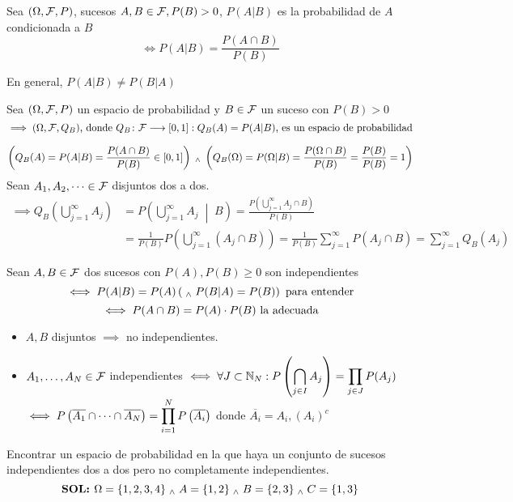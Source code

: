 \begin{defn}
	Sea $(\Omega, \mathcal{F}, P)$, sucesos $A, B \in \mathcal{F}, P(B)>0$, $P(A|B)$ es la probabilidad de $A$ condicionada a $B$
	\[\iff P(A|B)=\frac{P(A\cap B)}{P(B)}\]
	\begin{obs}
		En general, $P(A|B)\ne P(B|A)$
	\end{obs}
\end{defn}
\begin{prop}
	Sea $(\Omega, \mathcal{F}, P)$ un espacio de probabilidad y $B \in \mathcal{F}$ un suceso con $P(B)>0$
	\[\implies (\Omega, \mathcal{F}, Q_B) \text{, donde } Q_B \colon \mathcal{F} \longrightarrow \left[0,1\right]:Q_B(A)=P(A|B) \text{, es un espacio de probabilidad}\]
	\begin{dem}
		\[\left(Q_B(A)=P(A|B)=\frac{P(A\cap B)}{P(B)} \in \left[0, 1\right]\right) \; _{\wedge} \; \left(Q_B(\Omega)=P(\Omega|B)=\frac{P(\Omega\cap B)}{P(B)}=\frac{P(B)}{P(B)}=1\right)\]
		Sean $A_1, A_2, \dots \in \mathcal{F}$ disjuntos dos a dos.
		\begin{equation*}
			\begin{split}
				\implies Q_B\left(\bigcup_{j=1}^\infty A_j\right)&=P\left(\bigcup_{j=1}^\infty A_j\;\middle|\; B\right)=\frac{P\left(\bigcup_{j=1}^\infty A_j \cap B\right)}{P(B)}\\
				&=\frac{1}{P(B)}P\left(\bigcup_{j=1}^\infty (A_j \cap B)\right)=\frac{1}{P(B)}\sum_{j=1}^\infty P(A_j\cap B) = \sum_{j=1}^\infty Q_B(A_j)
			\end{split}
		\end{equation*}
	\end{dem}
\end{prop}

\begin{defn}[Independencia]
	Sean $A,B \in \mathcal{F}$ dos sucesos con $P(A), P(B) \geq 0$ son independientes
	\[\iff P(A|B) = P(A) \left(\; _{\wedge} \; P(B|A)=P(B)\right) \text{ para entender}\]
	\[\iff P(A\cap B)=P(A)\cdot P(B) \text{ la adecuada}\]
	\begin{itemize}[topsep=1pt, itemsep=1pt,parsep=3pt]
		\item $A, B$ disjuntos $\implies$ no independientes.
		\item $A_1, \dots, A_N \in \mathcal{F}$ independientes $\displaystyle \iff \forall J \subset \mathbb{N}_N: P\left(\bigcap_{j\in I} A_j\right)=\prod_{j\in J}P(A_j)$ \\
		$\displaystyle \iff P\left(\overline{A_1}\cap\cdots\cap\overline{A_N}\right)=\prod_{i=1}^N P\left(\overline{A_i}\right)$ donde $\overline{A_i}=A_i, (A_i)^c$
	\end{itemize}
\end{defn}
\begin{ejer}
	Encontrar un espacio de probabilidad en la que haya un conjunto de sucesos independientes dos a dos pero no completamente independientes.
	\[\textbf{SOL: }\Omega = \{1, 2, 3, 4\} \; _{\wedge} \; A=\{1, 2\} \; _{\wedge} \; B=\{2, 3\} \; _{\wedge} \; C=\{1,3\}\]
\end{ejer}

